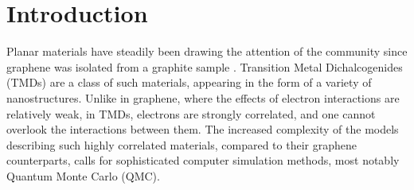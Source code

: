 
\section{Introduction}
\label{sec:intro}

Planar materials have steadily been drawing the attention of the community since graphene was isolated from a graphite sample \cite{novoselov_electric_2004}.
Transition Metal Dichalcogenides (TMDs) are a class of such materials, appearing in the form of a variety of nanostructures.
Unlike in graphene, where the effects of electron interactions are relatively weak, in TMDs, electrons are strongly correlated, and one cannot overlook the interactions between them.
The increased complexity of the models describing such highly correlated materials, compared to their graphene counterparts, calls for sophisticated computer simulation methods, most notably Quantum Monte Carlo (QMC).

